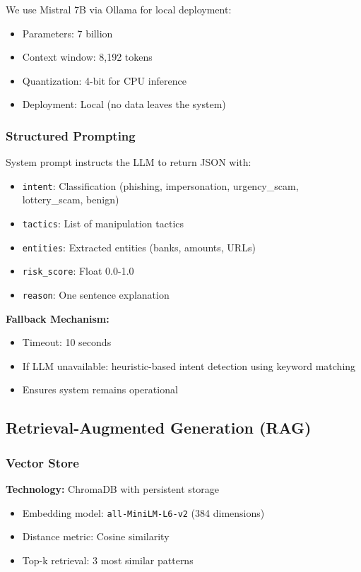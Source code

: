 We use Mistral 7B \cite{jiang2023mistral} via Ollama for local deployment:
\begin{itemize}
    \item Parameters: 7 billion
    \item Context window: 8,192 tokens
    \item Quantization: 4-bit for CPU inference
    \item Deployment: Local (no data leaves the system)
\end{itemize}

\subsubsection{Structured Prompting}

System prompt instructs the LLM to return JSON with:
\begin{itemize}
    \item \texttt{intent}: Classification (phishing, impersonation, urgency\_scam, lottery\_scam, benign)
    \item \texttt{tactics}: List of manipulation tactics
    \item \texttt{entities}: Extracted entities (banks, amounts, URLs)
    \item \texttt{risk\_score}: Float 0.0-1.0
    \item \texttt{reason}: One sentence explanation
\end{itemize}

\textbf{Fallback Mechanism:}
\begin{itemize}
    \item Timeout: 10 seconds
    \item If LLM unavailable: heuristic-based intent detection using keyword matching
    \item Ensures system remains operational
\end{itemize}

\subsection{Retrieval-Augmented Generation (RAG)}

\subsubsection{Vector Store}

\textbf{Technology:} ChromaDB with persistent storage
\begin{itemize}
    \item Embedding model: \texttt{all-MiniLM-L6-v2} (384 dimensions)
    \item Distance metric: Cosine similarity
    \item Top-k retrieval: 3 most similar patterns
\end{itemize}

